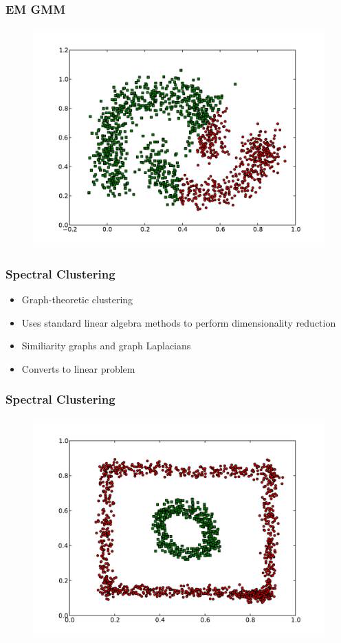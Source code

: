 \documentclass{beamer}
\begin{document}
\begin{frame}
\frametitle{EM GMM}
    \begin{figure}[]
    \includegraphics[scale=0.5]{GMM_half-moons.pdf}
    \end{figure}
\end{frame}



\begin{frame}
\frametitle{Spectral Clustering}
    \begin{itemize}
	\item Graph-theoretic clustering
    	\item Uses standard linear algebra methods to perform dimensionality reduction
   	\item Similiarity graphs and graph Laplacians
   	\item Converts to linear problem
    \end{itemize}
\end{frame}

\begin{frame}
\frametitle{Spectral Clustering}
    \begin{figure}[]
    \includegraphics[scale=0.5]{spectral_circle-weird.pdf}
    \end{figure}
\end{frame}
\end{document}
